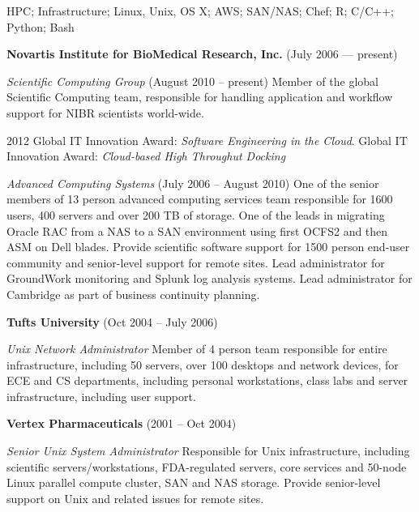 \documentclass[11pt,article,oneside]{memoir}
\begin{document}
\medskip

\reversemarginpar

\bigskip


\ind HPC; Infrastructure; Linux, Unix, OS X; AWS; SAN/NAS; Chef; R; C/C++; Python; Bash

\bigskip

{}

\ind \textbf{Novartis Institute for BioMedical Research, Inc.} (July 2006 --- present)

\noindent\textit{Scientific Computing Group} (August 2010 -- present) Member of the global Scientific Computing team, responsible for handling application and workflow support for NIBR scientists world-wide.

\ind \hspace{0.35in} \footnotesize 2012 Global IT Innovation Award: \textit{Software Engineering in the Cloud}. Global IT Innovation Award: \textit{Cloud-based High Throughut Docking} \normalsize \vspace{0.05in}

\noindent\textit{Advanced Computing Systems} (July 2006 -- August 2010) One of the senior members of 13 person advanced computing services team responsible for 1600 users, 400 servers and over 200 TB of storage. One of the leads in migrating Oracle RAC from a NAS to a SAN environment using first OCFS2 and then ASM on Dell blades. Provide scientific software support for 1500 person end-user community and senior-level support for remote sites. Lead administrator for GroundWork monitoring and Splunk log analysis systems. Lead administrator for Cambridge as part of business continuity planning.

\ind\textbf{Tufts University} (Oct 2004 -- July 2006)

\noindent\textit{Unix Network Administrator} Member of 4 person team responsible for entire infrastructure, including 50 servers, over 100 desktops and network devices, for ECE and CS departments, including personal workstations, class labs and server infrastructure, including user support.

\ind \textbf{Vertex Pharmaceuticals} (2001 -- Oct 2004)

\noindent\textit{Senior Unix System Administrator} Responsible for Unix infrastructure, including scientific servers/workstations, FDA-regulated servers, core services and 50-node Linux parallel compute cluster, SAN and NAS storage. Provide senior-level support on Unix and related issues for remote sites.
\end{document}
